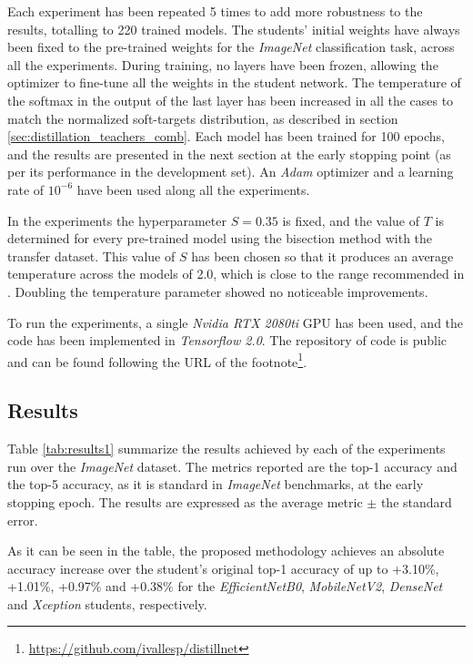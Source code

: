 Each experiment has been repeated 5 times to add more robustness to the results, totalling to 220 trained models. The students' initial weights have always been fixed to the pre-trained weights for the \textit{ImageNet} classification task, across all the experiments. During training, no layers have been frozen, allowing the optimizer to fine-tune all the weights in the student network. The temperature of the softmax in the output of the last layer has been increased in all the cases to match the normalized soft-targets distribution, as described in section \ref{sec:distillation_teachers_comb}.  Each model has been trained for 100 epochs, and the results are presented in the next section at the early stopping point (as per its performance in the development set). An \textit{Adam} optimizer \autocite{kingma14} and a learning rate of $10^{-6}$ have been used along all the experiments.

  In the experiments the hyperparameter $S=0.35$ is fixed, and the value of $T$ is determined for every pre-trained model using the bisection method with the transfer dataset. This value of $S$ has been chosen so that it produces an average temperature across the models of 2.0, which is close to the range recommended in \autocite{hinton2015}. Doubling the temperature parameter showed no noticeable improvements.

  To run the experiments, a single \textit{Nvidia RTX 2080ti} GPU has been used, and the code has been implemented in \textit{Tensorflow 2.0}. The repository of code is public and can be found following the URL of the footnote\footnote{\url{https://github.com/ivallesp/distillnet}}.

 \subsection{Results}  \label{sec:distillation_results}
 Table \ref{tab:results1} summarize the results achieved by each of the experiments run over the \textit{ImageNet} dataset. The metrics reported are the top-1 accuracy and the top-5 accuracy, as it is standard in \textit{ImageNet} benchmarks, at the early stopping epoch. The results are expressed as the average metric $\pm$ the standard error.

 As it can be seen in the table, the proposed methodology achieves an absolute accuracy increase over the student's original top-1 accuracy of up to +3.10\%, +1.01\%, +0.97\% and +0.38\% for the \textit{EfficientNetB0}, \textit{MobileNetV2},  \textit{DenseNet} and \textit{Xception} students, respectively.
 
